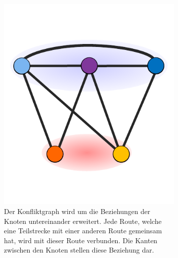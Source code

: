 \begin{figure}
\begin{subfigure}[t]{0.3\textwidth}
		\includegraphics[width=\textwidth]{img/bsp4}
		\caption{Der Konfliktgraph wird um die Beziehungen der Knoten untereinander erweitert. Jede Route, welche eine Teilstrecke mit einer anderen Route gemeinsam hat, wird mit dieser Route verbunden. Die Kanten zwischen den Knoten stellen diese Beziehung dar.}
		\label{fig:example:d}
	\end{subfigure}
	\begin{subfigure}[t]{0.3\textwidth}

\end{subfigure}
\end{figure}
